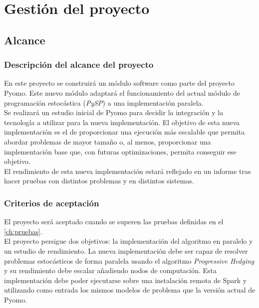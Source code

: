 \chapter{Gestión del proyecto}
\label{ch:gestion}

\section{Alcance}

\subsection{Descripción del alcance del proyecto}

En este proyecto se construirá un módulo software como parte del proyecto Pyomo. Este nuevo módulo adaptará el funcionamiento del actual módulo de programación estocástica (\textit{PySP}) a una implementación paralela.\\

Se realizará un estudio inicial de Pyomo para decidir la integración y la tecnología a utilizar para la nueva implementación. El objetivo de esta nueva implementación es el de proporcionar una ejecución más escalable que permita abordar problemas de mayor tamaño o, al menos, proporcionar una implementación base que, con futuras optimizaciones, permita conseguir ese objetivo.\\

El rendimiento de esta nueva implementación estará reflejado en un informe tras hacer pruebas con distintos problemas y en distintos sistemas.

\subsection{Criterios de aceptación}

El proyecto será aceptado cuando se superen las pruebas definidas en el \autoref{ch:pruebas}.\\

El proyecto persigue dos objetivos: la implementación del algoritmo en paralelo y un estudio de rendimiento. La nueva implementación debe ser capaz de resolver problemas estocásticos de forma paralela usando el algoritmo \textit{Progressive Hedging} y su rendimiento debe escalar añadiendo nodos de computación. Esta implementación debe poder ejecutarse sobre una instalación remota de Spark y utilizando como entrada los mismos modelos de problema que la versión actual de Pyomo. 

